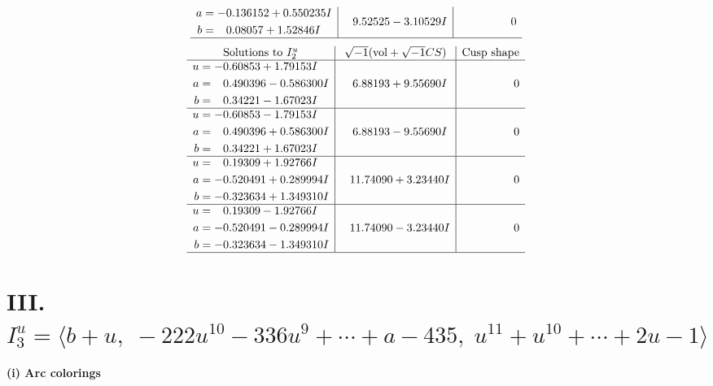 \documentclass[1p]{elsarticle_modified}
\theoremstyle{definition}
\newcommand{\I}{\sqrt{-1}}
\begin{document}
$$\begin{array}{c|c|c}
\begin{aligned}
a &= -0.136152 + 0.550235 I \\
b &= \phantom{-}0.08057 + 1.52846 I\end{aligned}
 & \phantom{-}9.52525 - 3.10529 I & \phantom{-0.000000 } 0\\
 \hline 
 \end{array}$$\newpage$$\begin{array}{c|c|c}  
\text{Solutions to }I^u_{2}& \I (\text{vol} + \sqrt{-1}CS) & \text{Cusp shape}\\
 \hline 
\begin{aligned}
u &= -0.60853 + 1.79153 I \\
a &= \phantom{-}0.490396 - 0.586300 I \\
b &= \phantom{-}0.34221 - 1.67023 I\end{aligned}
 & \phantom{-}6.88193 + 9.55690 I & \phantom{-0.000000 } 0 \\ \hline\begin{aligned}
u &= -0.60853 - 1.79153 I \\
a &= \phantom{-}0.490396 + 0.586300 I \\
b &= \phantom{-}0.34221 + 1.67023 I\end{aligned}
 & \phantom{-}6.88193 - 9.55690 I & \phantom{-0.000000 } 0 \\ \hline\begin{aligned}
u &= \phantom{-}0.19309 + 1.92766 I \\
a &= -0.520491 + 0.289994 I \\
b &= -0.323634 + 1.349310 I\end{aligned}
 & \phantom{-}11.74090 + 3.23440 I & \phantom{-0.000000 } 0 \\ \hline\begin{aligned}
u &= \phantom{-}0.19309 - 1.92766 I \\
a &= -0.520491 - 0.289994 I \\
b &= -0.323634 - 1.349310 I\end{aligned}
 & \phantom{-}11.74090 - 3.23440 I & \phantom{-0.000000 } 0\\
 \hline 
 \end{array}$$\newpage\newpage\renewcommand{\arraystretch}{1}
\centering \section*{III. $I^u_{3}= \langle b+u,\;-222 u^{10}-336 u^9+\cdots+a-435,\;u^{11}+u^{10}+\cdots+2 u-1 \rangle$}
\flushleft \textbf{(i) Arc colorings}\\
\end{document}
